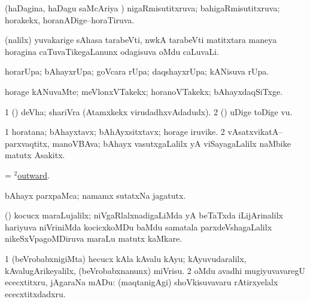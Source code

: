 \bentry
{}
\gl{\gu}
\bmng
(haDagina, haDagu saMcAriya \vi) nigaRmisutitxruva; bahigaRmisutitxruva; horakekx, horanADige--horaTiruva. 
\emng
\eentry

\bentry
{}
\gl{\nA}
\bmng
(\UK nalilx) yuvakarige sAhasa tarabeVti, nwkA tarabeVti matitxtara maneya horagina caTuvaTikegaLanunx odagisuva oMdu caLuvaLi. 
\emng
\eentry

\bentry
{}
\gl{\nA}
\bmng
horarUpa; bAhayxrUpa; goVcara rUpa; daqshayxrUpa; kANisuva rUpa. 
\emng
\eentry

\bentry
{}
\gl{\kirxvi}
\bmng
horage kANuvaMte; meVlonxVTakekx; horanoVTakekx; bAhayxdaqSiTxge. 
\emng
\eentry

\bentry
{}
\gl{\nA}
\bmng
\bnum
\num{1} (\deVva) deVha; shariVra (Atamxkekx virudadhxvAdadudx). 
\num{2} (\hA) uDige toDige \mo vu. 
\enum
\emng
\eentry

\bentry
{}
\gl{\nA}
\bmng
\bnum
\num{1} horatana; bAhayxtavx; bAhAyxsitxtavx; horage iruvike. 
\num{2} vAsatxvikatA--parxvaqtitx, manoVBAva; bAhayx vasutxgaLalilx yA viSayagaLalilx naMbike matutx Asakitx. 
\enum
\emng
\eentry

\bentry
{}
\gl{\kirxvi}
\bmng
= \hyperlink{outward(2)}{$^2$outward}. 
\emng
\eentry

\bentry
{}
\gl{\nA}
\bmng
bAhayx parxpaMca; namamx sutatxNa jagatutx. 
\emng
\eentry

\bentry
{}
\gl{\nA}
\bmng
(\BUvi) kocucx maraLujalilx; niVgaRlalxnadigaLiMda yA beTaTxda iLijArinalilx hariyuva niVriniMda kocicxkoMDu baMdu samatala parxdeVshagaLalilx nikeSxVpagoMDiruva maraLu matutx kaMkare. 
\emng
\eentry

\bentry
{}
\gl{\sakirx}
\bmng
\bnum
\num{1} (beVrobabxnigiMta) hecucx kAla kAvalu kAyu; kAyuvudaralilx, kAvalugArikeyalilx, (beVrobabxnanunx) miVrisu. 
\num{2} oMdu avadhi mugiyuvavaregU ececxtitxru, jAgaraNa mADu:  (maqtanigAgi) shoVkisuvavaru rAtirxyelalx ececxtitxdadxru. 
\enum
\emng
\eentry

